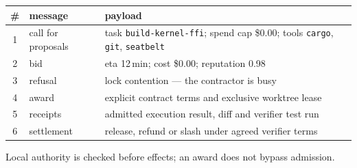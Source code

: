 \begin{minipage}{\pdfullwidth}
\par\vspace{4pt}
\footnotesize
\begin{tabular}{@{}c l l@{}}
\toprule
\# & message & payload \\
\midrule
1 & call for proposals & task \texttt{build-kernel-ffi}; spend cap \$0.00; tools \texttt{cargo}, \texttt{git}, \texttt{seatbelt} \\
2 & bid & eta 12\,min; cost \$0.00; reputation 0.98 \\
3 & refusal & lock contention --- the contractor is busy \\
4 & award & explicit contract terms and exclusive worktree lease \\
5 & receipts & admitted execution result, diff and verifier test run \\
6 & settlement & release, refund or slash under agreed verifier terms \\
\bottomrule
\end{tabular}
\par\smallskip
Local authority is checked before effects; an award does not bypass admission.
\end{minipage}

